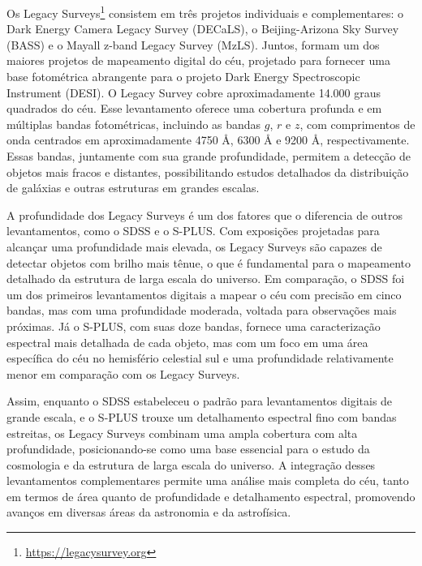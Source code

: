 Os Legacy Surveys\footnote{\url{https://legacysurvey.org}} \citep{legacy} consistem em três projetos individuais e complementares: o Dark Energy Camera Legacy Survey (DECaLS), o Beijing-Arizona Sky Survey (BASS) e o Mayall z-band Legacy Survey (MzLS). Juntos, formam um dos maiores projetos de mapeamento digital do céu, projetado para fornecer uma base fotométrica abrangente para o projeto Dark Energy Spectroscopic Instrument (DESI). O Legacy Survey cobre aproximadamente 14.000 graus quadrados do céu. Esse levantamento oferece uma cobertura profunda e em múltiplas bandas fotométricas, incluindo as bandas $g$, $r$ e $z$, com comprimentos de onda centrados em aproximadamente 4750 Å, 6300 Å e 9200 Å, respectivamente. Essas bandas, juntamente com sua grande profundidade, permitem a detecção de objetos mais fracos e distantes, possibilitando estudos detalhados da distribuição de galáxias e outras estruturas em grandes escalas.

A profundidade dos Legacy Surveys é um dos fatores que o diferencia de outros levantamentos, como o SDSS e o S-PLUS. Com exposições projetadas para alcançar uma profundidade mais elevada, os Legacy Surveys são capazes de detectar objetos com brilho mais tênue, o que é fundamental para o mapeamento detalhado da estrutura de larga escala do universo.
Em comparação, o SDSS foi um dos primeiros levantamentos digitais a mapear o céu com precisão em cinco bandas, mas com uma profundidade moderada, voltada para observações mais próximas. Já o S-PLUS, com suas doze bandas, fornece uma caracterização espectral mais detalhada de cada objeto, mas com um foco em uma área específica do céu no hemisfério celestial sul e uma profundidade relativamente menor em comparação com os Legacy Surveys.

Assim, enquanto o SDSS estabeleceu o padrão para levantamentos digitais de grande escala, e o S-PLUS trouxe um detalhamento espectral fino com bandas estreitas, os Legacy Surveys combinam uma ampla cobertura com alta profundidade, posicionando-se como uma base essencial para o estudo da cosmologia e da estrutura de larga escala do universo. A integração desses levantamentos complementares permite uma análise mais completa do céu, tanto em termos de área quanto de profundidade e detalhamento espectral, promovendo avanços em diversas áreas da astronomia e da astrofísica.





